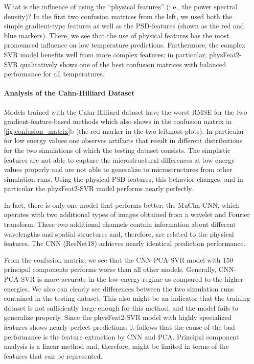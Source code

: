 \documentclass[11pt, authoryear]{elsarticle}
\begin{document}
	What is the influence of using the ``physical features'' (i.e., the power 
	spectral density)? In the first two confusion matrices from the left, we 
	used both the simple gradient-type features as well as the PSD-features 
	(shown as the red and blue markers). There, we see that the use of physical
	features has the most pronounced influence on low temperature 
	predictions. Furthermore, the complex SVR model benefits well from more 
	complex features; in particular, physFeat2-SVR qualitatively shows 
	one of the best confusion matrices with balanced performance for all 
	temperatures.
	
	\paragraph{Analysis of the Cahn-Hilliard Dataset}
	Models trained with the Cahn-Hilliard dataset have the worst
	\gls{RMSE} for the two gradient-feature-based methods  which
	also shows in the confusion matrix in \cref{fig:confusion_matrix}b (the
	red marker in the two leftmost plots). In particular for low energy values
	one observes artifacts that result in different distributions for the two
	simulations of which the testing dataset consists. The simplistic features
	are not able to capture the microstructural differences at low energy values 
	properly and are not able to generalize to microstructures from other 
	simulation runs.
	Using the physical PSD features, this behavior changes, and in particular
	the physFeat2-SVR model performs nearly perfectly.
	
	In fact, there is only one model that performs better: the MuCha-CNN, 
	which operates with two additional types of images obtained from a wavelet 
	and Fourier transform. These two additional channels contain information
	about different wavelengths and spatial structures and, therefore, are
	related to the physical features. The CNN (ResNet18) achieves nearly
	identical prediction performance.
	
	From the confusion matrix, we see that the CNN-PCA-SVR model with 150 
	principal components performs worse than all other models. Generally, 
	CNN-PCA-SVR is more accurate in the low energy regime as compared to the 
	higher energies. We also can clearly see differences between the two simulation 
	runs contained in the testing dataset. This also might be an indicator
	that the training dataset is not sufficiently large enough for this 
	method, and the model fails to generalize properly.
	Since the physFeat2-SVR model with highly specialized features shows 
	nearly perfect predictions, it follows that the cause of the bad 
	performance is the feature extraction by CNN and PCA. Principal component 
	analysis is a linear method and, therefore, might be limited in terms of the 
	features that can be represented.
	
\end{document}

